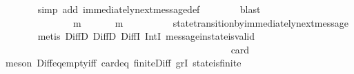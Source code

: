 \begin{isabellebody}
\ \ \ \ \ \ \isamarkupfalse%
\ {\isacharparenleft}simp\ add{\isacharcolon}\ immediately{\isacharunderscore}next{\isacharunderscore}message{\isacharunderscore}def{\isacharparenright}\isanewline
\ \ \ \ \ \ \isamarkupfalse%
\ blast\ \ \isanewline
\ \ \ \ \isamarkupfalse%
\ \isamarkupfalse%
\ {\isachardoublequoteopen}{\isasymforall}\ {\isasymsigma}\ {\isasymin}\ {\isasymSigma}{\isachardot}\ {\isasymforall}\ {\isasymsigma}{\isacharprime}\ {\isasymin}\ {\isasymSigma}{\isachardot}\ {\isasymnot}\ {\isasymsigma}\ {\isasymsubseteq}\ {\isasymsigma}{\isacharprime}\ {\isasymlongrightarrow}\ {\isacharparenleft}{\isasymexists}\ m\ {\isasymin}\ {\isasymsigma}\ {\isacharminus}\ {\isasymsigma}{\isacharprime}{\isachardot}\ {\isasymsigma}{\isacharprime}\ {\isasymunion}\ {\isacharbraceleft}m{\isacharbraceright}\ {\isasymin}\ {\isasymSigma}{\isacharparenright}{\isachardoublequoteclose}\isanewline
\ \ \ \ \ \ \isamarkupfalse%
\ state{\isacharunderscore}transition{\isacharunderscore}by{\isacharunderscore}immediately{\isacharunderscore}next{\isacharunderscore}message\isanewline
\ \ \ \ \ \ \isamarkupfalse%
\ {\isacharparenleft}metis\ DiffD{}\ DiffD{}\ DiffI\ IntI\ message{\isacharunderscore}in{\isacharunderscore}state{\isacharunderscore}is{\isacharunderscore}valid{\isacharparenright}\ \ \ \ \ \ \isanewline
\ \ \ \ \isamarkupfalse%
\ {\isachardoublequoteopen}{\isasymforall}\ {\isasymsigma}\ {\isasymin}\ {\isasymSigma}{\isachardot}\ {\isasymforall}\ {\isasymsigma}{\isacharprime}\ {\isasymin}\ {\isasymSigma}{\isachardot}\ {\isasymnot}\ {\isasymsigma}\ {\isasymsubseteq}\ {\isasymsigma}{\isacharprime}\ {\isasymlongrightarrow}\ \ {\isasymsigma}\ {\isasymunion}\ {\isasymsigma}{\isacharprime}\ {\isasymin}\ {\isasymSigma}{\isachardoublequoteclose}\isanewline
\ \ \ \ \isamarkupfalse%
\ {\isacharminus}\ \isanewline
\ \ \ \ \ \ \isamarkupfalse%
\ {\isachardoublequoteopen}{\isasymforall}\ {\isasymsigma}\ {\isasymin}\ {\isasymSigma}{\isachardot}\ {\isasymforall}\ {\isasymsigma}{\isacharprime}\ {\isasymin}\ {\isasymSigma}{\isachardot}\ {\isasymnot}\ {\isasymsigma}\ {\isasymsubseteq}\ {\isasymsigma}{\isacharprime}\ {\isasymlongrightarrow}\ card\ {\isacharparenleft}{\isasymsigma}\ {\isacharminus}\ {\isasymsigma}{\isacharprime}{\isacharparenright}\ {\isachargreater}\ {}{\isachardoublequoteclose}\isanewline
\ \ \ \ \ \ \ \ \isamarkupfalse%
\ {\isacharparenleft}meson\ Diff{\isacharunderscore}eq{\isacharunderscore}empty{\isacharunderscore}iff\ card{\isacharunderscore}{}{\isacharunderscore}eq\ finite{\isacharunderscore}Diff\ gr{}I\ state{\isacharunderscore}is{\isacharunderscore}finite{\isacharparenright}\isanewline

\end{isabellebody}
